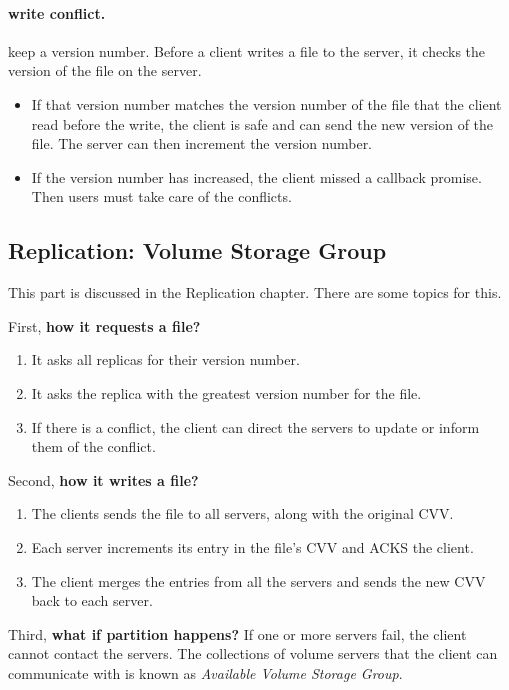 \paragraph{write conflict.} keep a version number. Before a client writes a file to the server, it checks the version of the file on the server. 
\begin{itemize}
    \item If that version number matches the version number of the file that the client read before the write, the client is safe and can send the new version of the file. The server can then increment the version number.
    \item If the version number has increased, the client missed a callback promise. Then users must take care of the conflicts.
\end{itemize}

\subsection{Replication: Volume Storage Group}
This part is discussed in the Replication chapter. There are some topics for this. 

First, \textbf{how it requests a file?}
\begin{enumerate}
    \item It asks all replicas for their version number.
    \item It asks the replica with the greatest version number for the file.
    \item If there is a conflict, the client can direct the servers to update or inform them of the conflict.
\end{enumerate}

Second, \textbf{how it writes a file?}
\begin{enumerate}
    \item The clients sends the file to all servers, along with the original CVV.
    \item Each server increments its entry in the file's CVV and ACKS the client.
    \item The client merges the entries from all the servers and sends the new CVV back to each server.
\end{enumerate}

Third, \textbf{what if partition happens?}
If one or more servers fail, the client cannot contact the servers. The collections of volume servers that the client can communicate with is known as \emph{Available Volume Storage Group}. 

